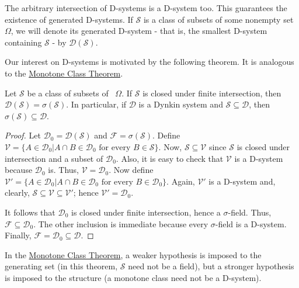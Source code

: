 The arbitrary intersection of D-systems is a D-system too. This guarantees the existence of generated D-systems. If \(\mathcal{S}\) is a class of subsets of some nonempty set \(\Omega\), we will denote its generated D-system - that is, the smallest D-system containing \(\mathcal{S}\) - by \(\mathcal{D}(\mathcal{S})\).

Our interest on D-systems is motivated by the following theorem. It is analogous to the \hyperref[theorem:Monotone Class]{Monotone Class Theorem}.
\begin{thrm}\label{theorem:D-system}
		Let \(\mathcal{S}\) be a class of subsets of ~\(\Omega\). If 
		 \(\mathcal{S}\) is closed under finite intersection, then \(\mathcal{D}(\mathcal{S})=\sigma(\mathcal{S})\). In particular, if \(\mathcal{D}\) is a Dynkin system and \(\mathcal{S}\subseteq\mathcal{D}\), then \(\sigma(\mathcal{S})\subseteq\mathcal{D}\).
\end{thrm}
\begin{proof}
Let \(\mathcal{D}_0=\mathcal{D}(\mathcal{S})\) and \(\mathcal{F}=\sigma(\mathcal{S})\). Define \(\mathcal{V}=\{A\in\mathcal{D}_0\left|A\cap B\in \mathcal{D}_0 \text{ for every }B\in\mathcal{S} \right.\}\). Now, \(\mathcal{S}\subseteq\mathcal{V}\) since \(\mathcal{S}\) is closed under intersection and a subset of \(\mathcal{D}_0\). Also, it is easy to check that \(\mathcal{V}\) is a D-system because \(\mathcal{D}_0\) is. Thus, \(\mathcal{V}=\mathcal{D}_0\). Now define \(\mathcal{V}'=\{A\in\mathcal{D}_0\left|A\cap B\in\mathcal{D}_0 \text{ for every }B\in\mathcal{D}_0\right.\}\). Again, \(\mathcal{V}'\) is a D-system and, clearly, \(\mathcal{S}\subseteq\mathcal{V}\subseteq\mathcal{V}'\); hence \(\mathcal{V}'=\mathcal{D}_0\).

It follows that \(\mathcal{D}_0\) is closed under finite intersection, hence a \(\sigma\)-field. Thus, \(\mathcal{F}\subseteq\mathcal{D}_0\). The other inclusion is immediate because every \(\sigma\)-field is a D-system. Finally, \(\mathcal{F}=\mathcal{D}_0\subseteq\mathcal{D}\).
\end{proof}
In the \hyperref[theorem:Monotone Class]{Monotone Class Theorem}, a weaker hypothesis is imposed to the generating set (in this theorem, \(\mathcal{S}\) need not be a field), but a stronger hypothesis is imposed
to the structure (a monotone class need not be a D-system).


